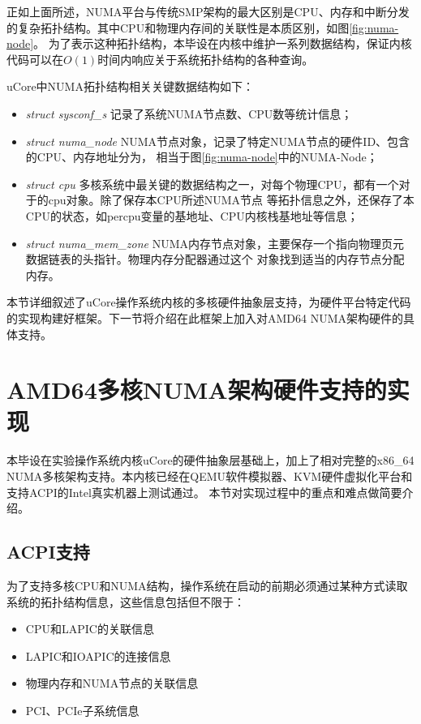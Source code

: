 正如上面所述，NUMA平台与传统SMP架构的最大区别是CPU、内存和中断分发的复杂拓扑结构。其中CPU和物理内存间的关联性是本质区别，如图\ref{fig:numa-node}。
为了表示这种拓扑结构，本毕设在内核中维护一系列数据结构，保证内核代码可以在$O(1)$时间内响应关于系统拓扑结构的各种查询。

uCore中NUMA拓扑结构相关关键数据结构如下：
\begin{itemize}
\item \emph{struct sysconf\_s}  \pozhehao 记录了系统NUMA节点数、CPU数等统计信息；
\item \emph{struct numa\_node} \pozhehao NUMA节点对象，记录了特定NUMA节点的硬件ID、包含的CPU、内存地址分为，
	相当于图\ref{fig:numa-node}中的NUMA-Node；
\item \emph{struct cpu} \pozhehao 多核系统中最关键的数据结构之一，对每个物理CPU，都有一个对于的cpu对象。除了保存本CPU所述NUMA节点
等拓扑信息之外，还保存了本CPU的状态，如percpu变量的基地址、CPU内核栈基地址等信息；
\item \emph{struct numa\_mem\_zone} \pozhehao NUMA内存节点对象，主要保存一个指向物理页元数据链表的头指针。物理内存分配器通过这个
对象找到适当的内存节点分配内存。
\end{itemize}

本节详细叙述了uCore操作系统内核的多核硬件抽象层支持，为硬件平台特定代码的实现构建好框架。下一节将介绍在此框架上加入对AMD64 NUMA架构硬件的具体支持。


\section{AMD64多核NUMA架构硬件支持的实现}
本毕设在实验操作系统内核uCore的硬件抽象层基础上，加上了相对完整的x86\_64
NUMA多核架构支持。本内核已经在QEMU软件模拟器、KVM硬件虚拟化平台和支持ACPI的Intel真实机器上测试通过。
本节对实现过程中的重点和难点做简要介绍。

\subsection{ACPI支持}
为了支持多核CPU和NUMA结构，操作系统在启动的前期必须通过某种方式读取系统的拓扑结构信息，这些信息包括但不限于：
\begin{itemize}
\item CPU和LAPIC的关联信息
\item LAPIC和IOAPIC的连接信息
\item 物理内存和NUMA节点的关联信息
\item PCI、PCIe子系统信息
\end{itemize}

